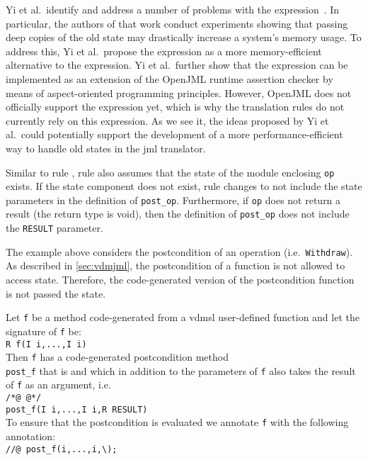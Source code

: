 Yi et al.\ identify and address a number of problems with the \old
expression~\cite{Yi&2013}. In particular, the authors of that work
conduct experiments showing that passing deep copies of the old state
may drastically increase a system's memory usage. To address this, Yi
et al.\ propose the \past expression as a more memory-efficient
alternative to the \old expression. Yi et al.\ further show that the
\past expression can be implemented as an extension of the OpenJML
runtime assertion checker by means of aspect-oriented programming
principles. However, OpenJML does not officially support the \past
expression yet, which is why the translation rules do not currently
rely on this expression. As we see it, the ideas proposed by Yi et
al.\ could potentially support the development of a more
performance-efficient way to handle old states in the \ac{jml}
translator.

Similar to rule , rule  also assumes that
the state of the module enclosing \texttt{op} exists. If the state
component does not exist, rule  changes to not include
the state parameters in the definition of
\texttt{post\_op}. Furthermore, if \texttt{op} does not return a
result (the return type is void), then the definition of
\texttt{post\_op} does not include the \texttt{RESULT} parameter.

The example above considers the postcondition of an operation (i.e.\
\texttt{Withdraw}). As described in \autoref{sec:vdmjml}, the
postcondition of a function is not allowed to access state. Therefore, the
code-generated version of the postcondition function is not
passed the state.

 {
  Let \texttt{f} be a method code-generated from a \ac{vdmsl} user-defined function and let the signature of \texttt{f} be:\\
  \kw{static} \texttt{R f(I\sub{1} i\sub{1},...,I\sub{n} i\sub{n})}\\
  Then \texttt{f} has a code-generated postcondition method\\
  \texttt{post\_f} that is  and which in addition to the
  parameters of \texttt{f} also takes the result of \texttt{f} as an argument, i.e.\ \\
  \texttt{/*@ \kw{pure} @*/} \kw{static} \texttt{ \kw{boolean}\\
    post\_f(I i\sub{1},...,I i\sub{n},R RESULT)}\\
  To ensure that the postcondition is evaluated we annotate \texttt{f} with the following  annotation:\\
  \texttt{//@ \kw{ensures}
    post\_f(i,...,i,\textbackslash{});}}


